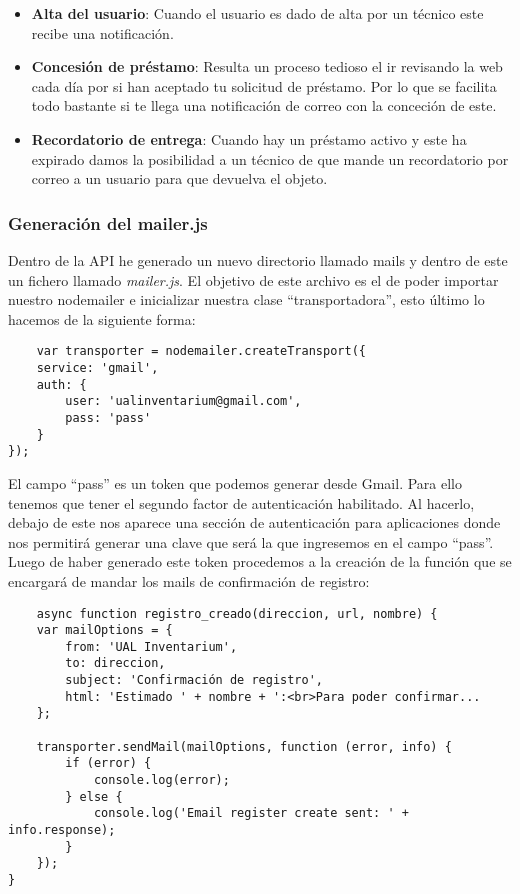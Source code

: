 \begin{itemize}
\begin{tcolorbox}
          \end{tcolorbox}
    \item \textbf{Alta del usuario}: Cuando el usuario es dado de alta por un técnico este recibe una notificación.
    \item \textbf{Concesión de préstamo}: Resulta un proceso tedioso el ir revisando la web cada día por si han aceptado tu solicitud de préstamo. Por lo que se facilita todo bastante si te llega una notificación de correo con la conceción de este.
    \item \textbf{Recordatorio de entrega}: Cuando hay un préstamo activo y este ha expirado damos la posibilidad a un técnico de que mande un recordatorio por correo a un usuario para que devuelva el objeto.
\end{itemize}

\subsubsection{Generación del mailer.js}
Dentro de la API he generado un nuevo directorio llamado mails y dentro de este un fichero llamado \textit{mailer.js}. El objetivo de este archivo es el de poder importar nuestro nodemailer e inicializar nuestra clase ``transportadora'', esto último lo hacemos de la siguiente forma:
\begin{verbatim}
    var transporter = nodemailer.createTransport({
    service: 'gmail',
    auth: {
        user: 'ualinventarium@gmail.com',
        pass: 'pass'
    }
});
\end{verbatim}
El campo ``pass'' es un token que podemos generar desde Gmail. Para ello tenemos que tener el segundo factor de autenticación habilitado. Al hacerlo, debajo de este nos aparece una sección de autenticación para aplicaciones donde nos permitirá generar una clave que será la que ingresemos en el campo ``pass''.
\\Luego de haber generado este token procedemos a la creación de la función que se encargará de mandar los mails de confirmación de registro:
\begin{verbatim}
    async function registro_creado(direccion, url, nombre) {
    var mailOptions = {
        from: 'UAL Inventarium',
        to: direccion,
        subject: 'Confirmación de registro',
        html: 'Estimado ' + nombre + ':<br>Para poder confirmar...
    };

    transporter.sendMail(mailOptions, function (error, info) {
        if (error) {
            console.log(error);
        } else {
            console.log('Email register create sent: ' + info.response);
        }
    });
}
\end{verbatim}
